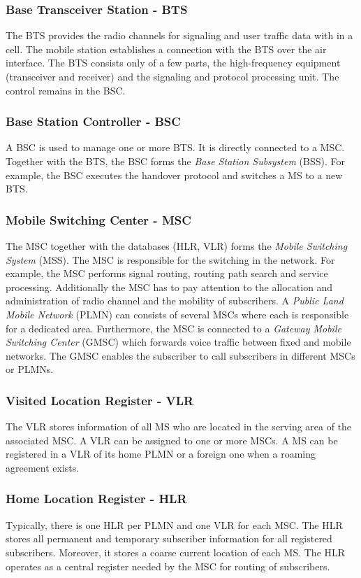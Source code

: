 \subsubsection{Base Transceiver Station - BTS}
The BTS provides the radio channels for signaling and user traffic data with in a cell. The mobile station establishes a connection with the BTS over the air interface. The BTS consists only of a few parts, the high-frequency equipment (transceiver and receiver) and the signaling and protocol processing unit. The control remains in the BSC.
\subsubsection{Base Station Controller - BSC}
A BSC is used to manage one or more BTS. It is directly connected to a MSC. Together with the BTS, the BSC forms the \emph{Base Station Subsystem} (BSS). For example, the BSC executes the handover protocol and switches a MS to a new BTS.
\subsubsection{Mobile Switching Center - MSC}
The MSC together with the databases (HLR, VLR) forms the \emph{Mobile Switching System} (MSS). The MSC is responsible for the switching in the network. For example, the MSC performs signal routing, routing path search and service processing. Additionally the MSC has to pay attention to the allocation and administration of radio channel and the mobility of subscribers. A \emph{Public Land Mobile Network} (PLMN) can consists of several MSCs where each is responsible for a dedicated area.
Furthermore, the MSC is connected to a \emph{Gateway Mobile Switching Center} (GMSC) which forwards voice traffic between fixed and mobile networks. The GMSC enables the subscriber to call subscribers in different MSCs or PLMNs.
\subsubsection{Visited Location Register - VLR}
The VLR stores information of all MS who are located in the serving area of the associated MSC. A VLR can be assigned to one or more MSCs. A MS can be registered in a VLR of its home PLMN or a foreign one when a roaming agreement exists.
\subsubsection{Home Location Register - HLR}
Typically, there is one HLR per PLMN and one VLR for each MSC. The HLR stores all permanent and temporary subscriber information for all registered subscribers. Moreover, it stores a coarse current location of each MS. The HLR operates as a central register needed by the MSC for routing of subscribers.

